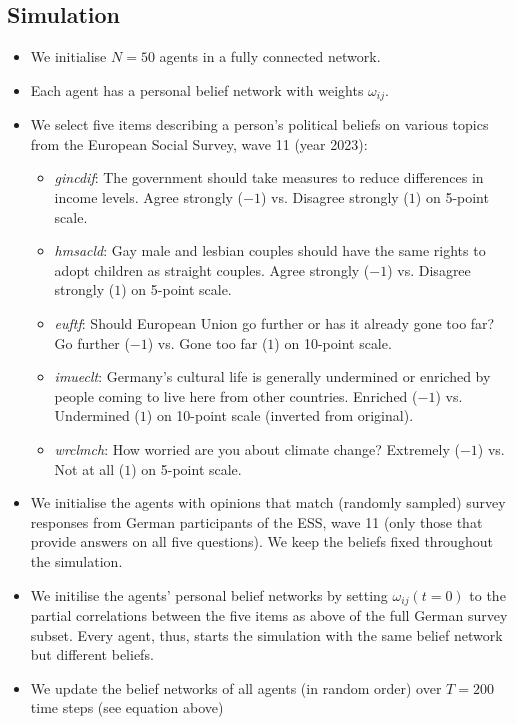 \documentclass[10pt]{article}
\begin{document}
\subsection{Simulation}
\begin{itemize}
    \item We initialise $N=50$ agents in a fully connected network.
    \item Each agent has a personal belief network with weights $\omega_{ij}$. 
    \item We select five items describing a person's political beliefs on various topics from the European Social Survey, wave 11 (year 2023): 
    \begin{itemize}
        \item \textit{gincdif}: The government should take measures to reduce differences in income levels. Agree strongly ($-1$) vs. Disagree strongly ($1$) on 5-point scale.
        \item \textit{hmsacld}: Gay male and lesbian couples should have the same rights to adopt children as straight couples. Agree strongly ($-1$) vs. Disagree strongly ($1$) on 5-point scale.
        \item \textit{euftf}: Should European Union go further or has it already gone too far? Go further ($-1$) vs. Gone too far ($1$) on 10-point scale.
        \item \textit{imueclt}: Germany's cultural life is generally undermined or enriched by people coming to live here from other countries. Enriched ($-1$) vs. Undermined ($1$) on 10-point scale (inverted from original).
        \item \textit{wrclmch}: How worried are you about climate change? Extremely ($-1$) vs. Not at all ($1$) on 5-point scale.
    \end{itemize}
    \item We initialise the agents with opinions that match (randomly sampled) survey responses from German participants of the ESS, wave 11 (only those that provide answers on all five questions). We keep the beliefs fixed throughout the simulation.
    \item We initilise the agents' personal belief networks by setting $\omega_{ij}(t=0)$ to the partial correlations  between the five items as above of the full German survey subset. Every agent, thus, starts the simulation with the same belief network but different beliefs.
    \item We update the belief networks of all agents (in random order) over $ T=200 $ time steps (see equation above)

\end{itemize}
\end{document}
